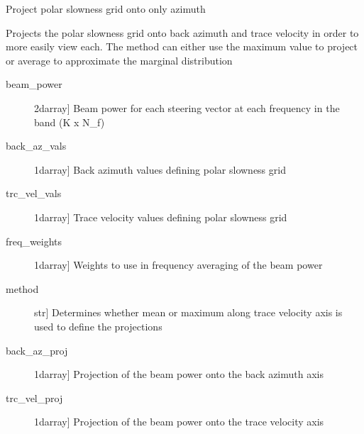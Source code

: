 \documentclass[letterpaper,10pt,english]{sphinxmanual}
\begin{document}
\begin{fulllineitems}
\label{\detokenize{infrapy.detection:infrapy.detection.beamforming_new.project_beam}}
Project polar slowness grid onto only azimuth

Projects the polar slowness grid onto back azimuth and trace velocity in order to
more easily view each.  The method can either use the maximum value to project or
average to approximate the marginal distribution
\begin{description}
\item[{beam\_power}] \leavevmode{[}2darray{]}
Beam power for each steering vector at each frequency in the band (K x N\_f)

\item[{back\_az\_vals}] \leavevmode{[}1darray{]}
Back azimuth values defining polar slowness grid

\item[{trc\_vel\_vals}] \leavevmode{[}1darray{]}
Trace velocity values defining polar slowness grid

\item[{freq\_weights}] \leavevmode{[}1darray{]}
Weights to use in frequency averaging of the beam power

\item[{method}] \leavevmode{[}str{]}
Determines whether mean or maximum along trace velocity axis is used to
define the projections

\end{description}
\begin{description}
\item[{back\_az\_proj}] \leavevmode{[}1darray{]}
Projection of the beam power onto the back azimuth axis

\item[{trc\_vel\_proj}] \leavevmode{[}1darray{]}
Projection of the beam power onto the trace velocity axis

\end{description}

\end{fulllineitems}

\end{document}
